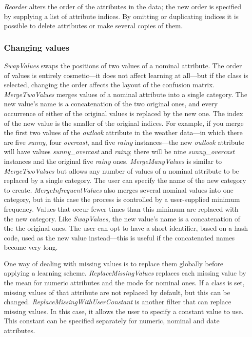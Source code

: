 \textit{Reorder} alters the order of the attributes in the data; the
new order is specified by supplying a list of attribute indices. By
omitting or duplicating indices it is possible to delete attributes or
make several copies of them.

\subsubsection{Changing values}

\textit{SwapValues} swaps the positions of two values of a nominal
attribute. The order of values is entirely cosmetic---it does not affect
learning at all---but if the class is selected, changing the order
affects the layout of the confusion matrix. \textit{MergeTwoValues}
merges values of a nominal attribute into a single category. The new
value's name is a concatenation of the two original ones, and every
occurrence of either of the original values is replaced by the new
one. The index of the new value is the smaller of the original
indices. For example, if you merge the first two values of the
\textit{outlook} attribute in the weather data---in which there are
five \textit{sunny}, four \textit{overcast}, and five \textit{rainy}
instances---the new \textit{outlook} attribute will have values
\textit{sunny\_overcast} and \textit{rainy}; there will be nine
\textit{sunny\_overcast} instances and the original five \textit{rainy}
ones. \textit{MergeManyValues} is similar to \textit{MergeTwoValues}
but allows any number of values of a nominal attribute to be replaced
by a single category. The user can specify the name of the new
category to create. \textit{MergeInfrequentValues} also merges several
nominal values into one category, but in this case the process is
controlled by a user-supplied minimum frequency. Values that occur
fewer times than this minimum are replaced with the new category. Like
\textit{SwapValues}, the new value's name is a concatenation of the
the original ones. The user can opt to have a short identifier, based
on a hash code, used as the new value instead---this is useful if the
concatenated names become very long.

One way of dealing with missing values is to replace them globally
before applying a learning scheme. \textit{ReplaceMissingValues}
replaces each missing value by the mean for numeric attributes and the
mode for nominal ones. If a class is set, missing values of that
attribute are not replaced by default, but this can be
changed. \textit{ReplaceMissingWithUserConstant} is another filter
that can replace missing values. In this case, it allows the user to
specify a constant value to use. This constant can be specified
separately for numeric, nominal and date attributes.

